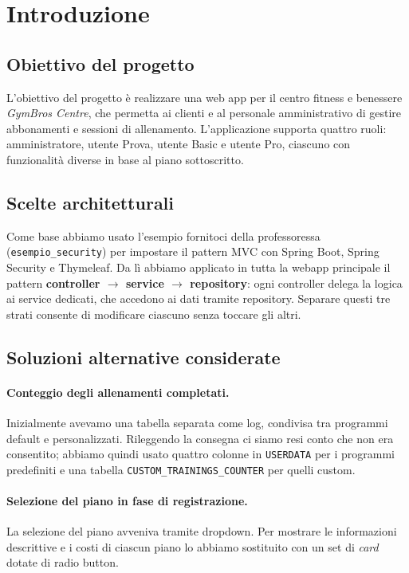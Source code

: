 \section{Introduzione}

\subsection{Obiettivo del progetto}
L'obiettivo del progetto è realizzare una web app per il centro fitness e benessere \textit{GymBros Centre}, che permetta ai clienti e al personale amministrativo di gestire abbonamenti e sessioni di allenamento. L'applicazione supporta quattro ruoli: amministratore, utente Prova, utente Basic e utente Pro, ciascuno con funzionalità diverse in base al piano sottoscritto.

\subsection{Scelte architetturali}
Come base abbiamo usato l'esempio fornitoci della professoressa (\texttt{esempio\_security}) per impostare il pattern MVC con Spring Boot, Spring Security e Thymeleaf. Da lì abbiamo applicato in tutta la webapp principale il pattern \textbf{controller $\to$ service $\to$ repository}: ogni controller delega la logica ai service dedicati, che accedono ai dati tramite repository. Separare questi tre strati consente di modificare ciascuno senza toccare gli altri.

\subsection{Soluzioni alternative considerate}

\paragraph{Conteggio degli allenamenti completati.}
Inizialmente avevamo una tabella separata come log, condivisa tra programmi default e personalizzati. Rileggendo la consegna ci siamo resi conto che non era consentito; abbiamo quindi usato quattro colonne in \texttt{USERDATA} per i programmi predefiniti e una tabella \texttt{CUSTOM\_TRAININGS\_COUNTER} per quelli custom.

\paragraph{Selezione del piano in fase di registrazione.}
La selezione del piano avveniva tramite dropdown. Per mostrare le informazioni descrittive e i costi di ciascun piano lo abbiamo sostituito con un set di \textit{card} dotate di radio button.

